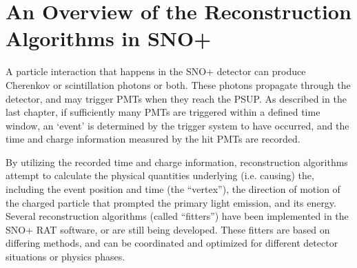 
\section{An Overview of the Reconstruction Algorithms in SNO+}

A particle interaction that happens in the SNO+ detector can produce Cherenkov or scintillation photons or both. These photons propagate through the detector, and may trigger PMTs when they reach the PSUP. As described in the last chapter, if sufficiently many PMTs are triggered within a defined time window, an `event' is determined by the trigger system to have occurred, and the time and charge information measured by the hit PMTs are recorded.

By utilizing the recorded time and charge information, reconstruction algorithms attempt to calculate the physical quantities underlying (i.e. causing) the, including the event position and time (the ``vertex''), the direction of motion of the charged particle that prompted the primary light emission, and its energy. Several reconstruction algorithms (called ``fitters'') have been implemented in the SNO+ RAT software, or are still being developed. These fitters are based on differing methods, and can be coordinated and optimized for different detector situations or physics phases.


